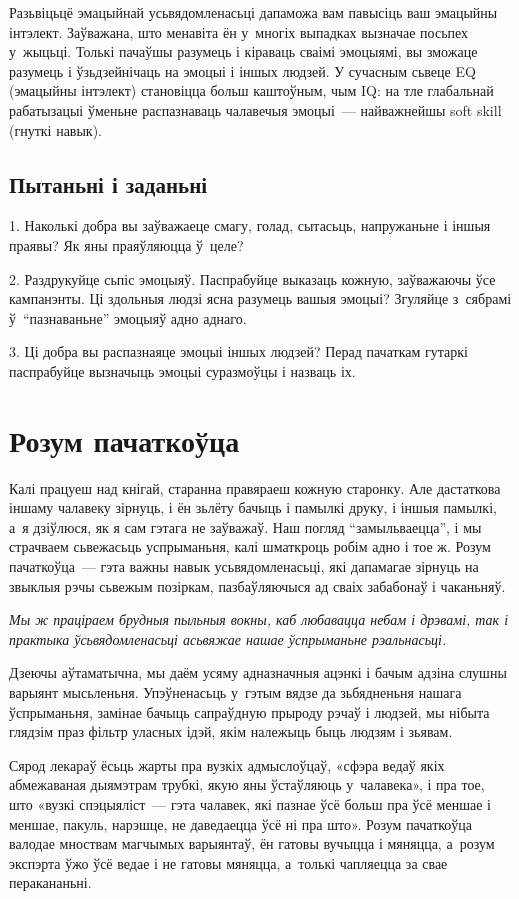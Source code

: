 Разьвіцьцё эмацыйнай усьвядомленасьці дапаможа вам павысіць ваш эмацыйны інтэлект. Заўважана, што менавіта ён у~многіх выпадках вызначае посьпех у~жыцьці. Толькі пачаўшы разумець і кіраваць сваімі эмоцыямі, вы зможаце разумець і ўзьдзейнічаць на эмоцыі і іншых людзей. У сучасным сьвеце EQ (эмацыйны інтэлект) становіцца больш каштоўным, чым IQ: на тле глабальнай рабатызацыі ўменьне распазнаваць чалавечыя эмоцыі~--- найважнейшы soft skill (гнуткі навык).

\subsection*{Пытаньні і заданьні}

1. Наколькі добра вы заўважаеце смагу, голад, сытасьць, напружаньне і іншыя праявы? Як яны праяўляюцца ў~целе?

2. Раздрукуйце сьпіс эмоцыяў. Паспрабуйце выказаць кожную, заўважаючы ўсе кампанэнты. Ці здольныя людзі ясна разумець вашыя эмоцыі? Згуляйце з~сябрамі ў~``пазнаваньне'' эмоцыяў адно аднаго.

3. Ці добра вы распазнаяце эмоцыі іншых людзей? Перад пачаткам гутаркі паспрабуйце вызначыць эмоцыі суразмоўцы і назваць іх.


\section{Розум пачаткоўца}

Калі працуеш над кнігай, старанна правяраеш кожную старонку. Але дастаткова іншаму чалавеку зірнуць, і ён зьлёту бачыць і памылкі друку, і іншыя памылкі, а~я дзіўлюся, як я сам гэтага не заўважаў. Наш погляд ``замыльваецца'', і мы страчваем сьвежасьць успрыманьня, калі шматкроць робім адно і тое ж. Розум пачаткоўца~--- гэта важны навык усьвядомленасьці, які дапамагае зірнуць на звыклыя рэчы сьвежым позіркам, пазбаўляючыся ад сваіх забабонаў і чаканьняў.

\emph{Мы ж праціраем брудныя пыльныя вокны, каб любавацца небам і дрэвамі, так і практыка ўсьвядомленасьці асьвяжае нашае ўспрыманьне рэальнасьці.}

Дзеючы аўтаматычна, мы даём усяму адназначныя ацэнкі і бачым адзіна слушны варыянт мысьленьня. Упэўненасьць у~гэтым вядзе да зьбядненьня нашага ўспрыманьня, замінае бачыць сапраўдную прыроду рэчаў і людзей, мы нібыта глядзім праз фільтр уласных ідэй, якім належыць быць людзям і зьявам.

Сярод лекараў ёсьць жарты пра вузкіх адмыслоўцаў, «сфэра ведаў якіх абмежаваная дыямэтрам трубкі, якую яны ўстаўляюць у~чалавека», і пра тое, што «вузкі спэцыяліст~--- гэта чалавек, які пазнае ўсё больш пра ўсё меншае і меншае, пакуль, нарэшце, не даведаецца ўсё ні пра што». Розум пачаткоўца валодае мноствам магчымых варыянтаў, ён гатовы вучыцца і мяняцца, а~розум экспэрта ўжо ўсё ведае і не гатовы мяняцца, а~толькі чапляецца за свае перакананьні.

